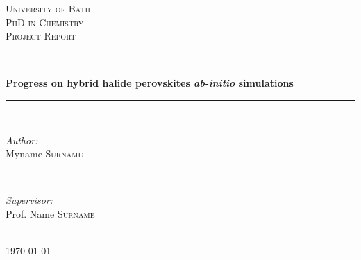 \documentclass[11pt]{article} %
\begin{document}
\begin{titlepage}

\newcommand{\HRule}{\rule{\linewidth}{0.5mm}} %
\center %

\textsc{\LARGE University of Bath}\\[1.5cm] %
\textsc{\Large PhD in Chemistry}\\[0.5cm] %
\textsc{\large Project Report}\\[0.5cm] %

\HRule \\[0.4cm]
{ \huge \bfseries Progress on hybrid halide perovskites \emph{ab-initio} simulations}\\[0.4cm] %
\HRule \\[1.5cm]

\begin{minipage}{0.4\textwidth}
\begin{flushleft} \large
\emph{Author:}\\
Myname \textsc{Surname} %
\end{flushleft}
\end{minipage}
~
\begin{minipage}{0.4\textwidth}
\begin{flushright} \large
\emph{Supervisor:} \\
Prof. Name \textsc{Surname} %
\end{flushright}
\end{minipage}\\[4cm]

{\large \today}\\[3cm] %


\vfill %
\end{titlepage}


\tableofcontents %
\end{document}
